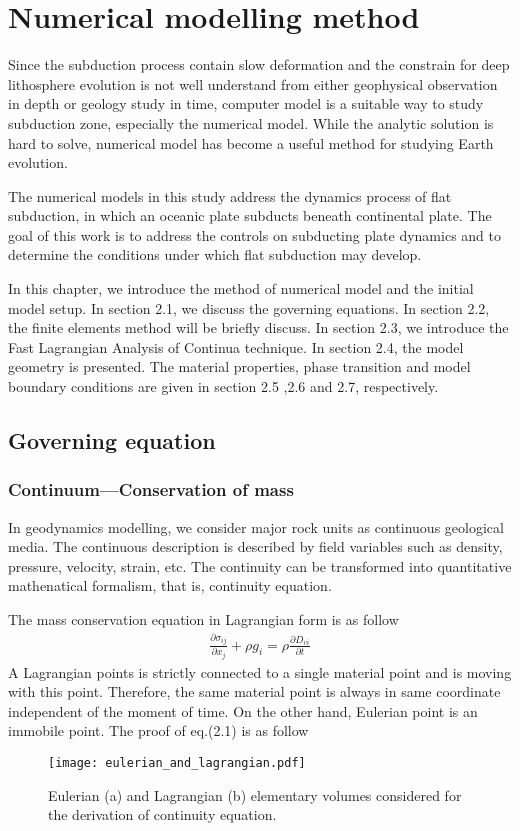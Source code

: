 
\chapter{Numerical modelling method}

Since the subduction process contain slow deformation and the constrain for deep lithosphere evolution is not well understand from either geophysical observation in depth or geology study in time, computer model is a suitable way to  study subduction zone, especially the numerical model. While the analytic solution is hard to solve, numerical model has become a useful method for studying Earth evolution. 

The numerical models in this study address the dynamics process of flat subduction, in which an oceanic plate subducts beneath continental plate. The goal of this work is to address the controls on subducting plate dynamics and to determine the conditions under which flat subduction may develop. 

In this chapter, we introduce the method of numerical model and the initial model setup. In section 2.1, we discuss the governing equations. In section 2.2, the finite elements method will be briefly discuss. In section 2.3, we introduce the Fast Lagrangian Analysis of Continua technique. In section 2.4, the model geometry is presented. The material properties, phase transition and model boundary conditions are given in section 2.5 ,2.6 and 2.7, respectively.

\section{Governing equation}

\subsection{Continuum---Conservation of mass}

In geodynamics modelling, we consider major rock units as continuous geological media. The continuous description is described by field variables such as density, pressure, velocity, strain, etc. 
The continuity can be transformed into quantitative mathenatical formalism, that is, continuity equation.

The mass conservation equation in Lagrangian form is as follow
\begin{align}
\frac{\partial \sigma_{ij}}{\partial x_j}+\rho g_i = \rho \frac{\partial D_{vi}}{\partial t} 
\end{align}
A Lagrangian points is strictly connected to a single material point and is moving with this point. Therefore, the same material point is always in same coordinate independent of the moment of time. On the other hand, Eulerian point is an immobile point.
The proof of eq.(2.1) is as follow
\begin{figure*}[ht!]
    \centering
    \texttt{[image: eulerian\_and\_lagrangian.pdf]}
    \caption{ Eulerian (a) and Lagrangian (b) elementary volumes considered for the derivation of continuity equation. }
    \label{fig::Lagrangian Volume}
\end{figure*}
 
